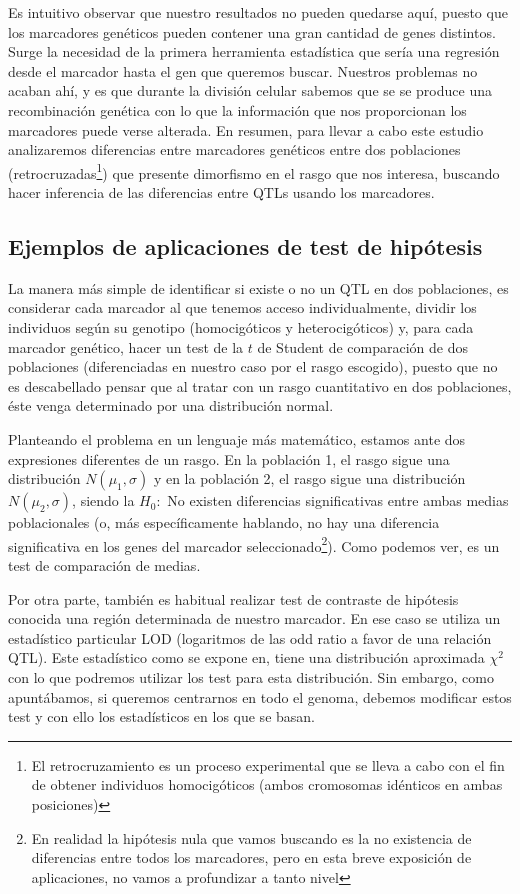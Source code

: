 \documentclass[a4paper,12pt]{article}
\begin{document}
Es intuitivo observar que nuestro resultados no pueden quedarse aquí, puesto que los marcadores genéticos pueden contener una gran cantidad de genes distintos. Surge la necesidad de la primera herramienta estadística que sería una regresión desde el marcador hasta el gen que queremos buscar. Nuestros problemas no acaban ahí, y es que durante la división celular sabemos que se se produce una recombinación genética con lo que la información que nos proporcionan los marcadores puede verse alterada. 
En resumen, para llevar a cabo este estudio analizaremos diferencias entre marcadores genéticos entre dos poblaciones (retrocruzadas\footnote{El retrocruzamiento es un proceso experimental que se lleva a cabo con el fin de obtener individuos homocigóticos (ambos cromosomas idénticos en ambas posiciones)}) que presente dimorfismo en el rasgo que nos interesa, buscando hacer inferencia de las diferencias entre QTLs usando los marcadores.

\subsection{Ejemplos de aplicaciones de test de hipótesis}
La manera más simple de identificar si existe o no un QTL en dos poblaciones, es considerar cada marcador al que tenemos acceso individualmente, dividir los individuos según su genotipo (homocigóticos y heterocigóticos) y, para cada marcador genético, hacer un test de la $t$ de Student de comparación de dos poblaciones (diferenciadas en nuestro caso por el rasgo escogido), puesto que no es descabellado pensar que al tratar con un rasgo cuantitativo en dos poblaciones, éste venga determinado por una distribución normal.

Planteando el problema en un lenguaje más matemático, estamos ante dos expresiones diferentes de un rasgo. En la población 1, el rasgo sigue una distribución $N(\mu_1,\sigma)$ y en la población 2, el rasgo sigue una distribución $N(\mu_2,\sigma)$, siendo la $H_0:$ No existen diferencias significativas entre ambas medias poblacionales (o, más específicamente hablando, no hay una diferencia significativa en los genes del marcador seleccionado\footnote{En realidad la hipótesis nula que vamos buscando es la no existencia de diferencias entre todos los marcadores, pero en esta breve exposición de aplicaciones, no vamos a profundizar a tanto nivel}).
Como podemos ver, es un test de comparación de medias.

Por otra parte, también es habitual realizar test de contraste de hipótesis conocida una región determinada de nuestro marcador. En ese caso se utiliza un estadístico particular LOD (logaritmos de las odd ratio a favor de una relación QTL). Este estadístico como se expone en,\cite{uned2} tiene una distribución aproximada $\chi^2$
con lo que podremos utilizar los test para esta distribución.
Sin embargo, como apuntábamos, si queremos centrarnos en todo el genoma, debemos modificar estos test y con ello los estadísticos en los que se basan. 
\end{document}
